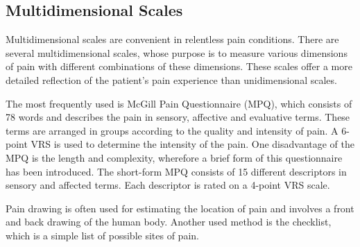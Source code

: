 \subsection{Multidimensional Scales}
Multidimensional scales are convenient in relentless pain conditions. There are several multidimensional scales, whose purpose is to measure various dimensions of pain with different combinations of these dimensions. These scales offer a more detailed reflection of the patient's pain experience than unidimensional scales. \cite{Briggs2010} 

The most frequently used is McGill Pain Questionnaire (MPQ), which consists of 78 words and describes the pain in sensory, affective and evaluative terms. These terms are arranged in groups according to the quality and intensity of pain. A 6-point VRS is used to determine the intensity of the pain. One disadvantage of the MPQ is the length and complexity, wherefore a brief form of this questionnaire has been introduced. The short-form MPQ consists of 15 different descriptors in sensory and affected terms. Each descriptor is rated on a 4-point VRS scale.~\cite{Katz2001}


Pain drawing is often used for estimating the location of pain and involves a front and back drawing of the human body. Another used method is the checklist, which is a simple list of possible sites of pain.~\cite{Jensen2001} 



